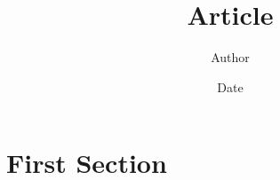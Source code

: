 \documentclass[a4paper, 12pt]{article}
\title{Article}
\author{Author}
\date{Date}
\begin{document}
\maketitle

\section{First Section}
\end{document}

